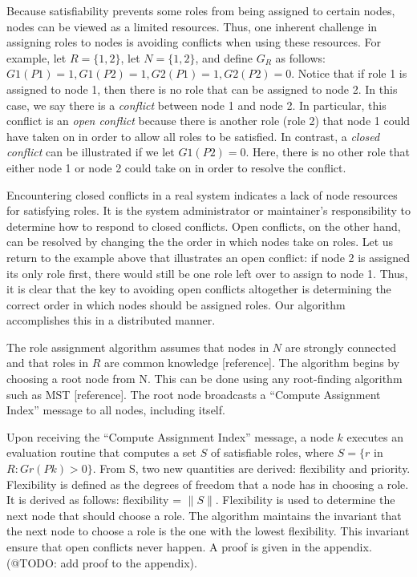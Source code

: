 \documentclass[11pt]{article}
\begin{document}
\begin{multicols}{2}
Because satisfiability prevents some roles from being assigned to certain nodes, nodes can be viewed as a limited resources. Thus, one inherent challenge in assigning roles to nodes is avoiding conflicts when using these resources. For example, let $R = \{1, 2\}$, let $N = \{1, 2\}$, and define $G_{R}$ as follows: $G1(P1) = 1, G1(P2) = 1, G2(P1) = 1, G2(P2) = 0$. Notice that if role 1 is assigned to node 1, then there is no role that can be assigned to node 2. In this case, we say there is a \textit{conflict} between node 1 and node 2. In particular, this conflict is an \textit{open conflict} because there is another role (role 2) that node 1 could have taken on in order to allow all roles to be satisfied. In contrast, a \textit{closed conflict} can be illustrated if we let $G1(P2) = 0$. Here, there is no other role that either node 1 or node 2 could take on in order to resolve the conflict.

Encountering closed conflicts in a real system indicates a lack of node resources for satisfying roles. It is the system administrator or maintainer's responsibility to determine how to respond to closed conflicts. Open conflicts, on the other hand, can be resolved by changing the the order in which nodes take on roles. Let us return to the example above that illustrates an open conflict: if node 2 is assigned its only role first, there would still be one role left over to assign to node 1. Thus, it is clear that the key to avoiding open conflicts altogether is determining the correct order in which nodes should be assigned roles. Our algorithm accomplishes this in a distributed manner.

The role assignment algorithm assumes that nodes in $N$ are strongly connected and that roles in $R$ are common knowledge [reference]. The algorithm begins by choosing a root node from N. This can be done using any root-finding algorithm such as MST [reference]. The root node broadcasts a ``Compute Assignment Index'' message to all nodes, including itself. 

Upon receiving the ``Compute Assignment Index'' message, a node $k$ executes an evaluation routine that computes a set $S$ of satisfiable roles, where $S = \{r$ in $R : Gr(Pk) > 0\}$. From S, two new quantities are derived: flexibility and priority. Flexibility is defined as the degrees of freedom that a node has in choosing a role. It is derived as follows: flexibility = $\|S\|$. Flexibility is used to determine the next node that should choose a role. The algorithm maintains the invariant that the next node to choose a role is the one with the lowest flexibility. This invariant ensure that open conflicts never happen. A proof is given in the appendix. (@TODO: add proof to the appendix).


\end{multicols}
\end{document}
